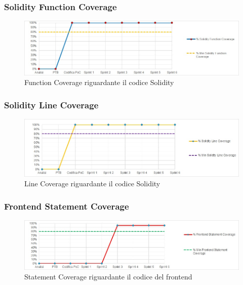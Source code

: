 \subsubsection{Solidity Function Coverage}
\begin{figure}[H]
  \centering
  \includegraphics[scale=0.8]{immagini/solidity_function.jpg}
  \caption{Function Coverage riguardante il codice Solidity}
\end{figure}

\subsubsection{Solidity Line Coverage}
\begin{figure}[H]
  \centering
  \includegraphics[scale=0.8]{immagini/solidity_line.jpg}
  \caption{Line Coverage riguardante il codice Solidity}
\end{figure}

\subsubsection{Frontend Statement Coverage}
\begin{figure}[H]
  \centering
  \includegraphics[scale=0.8]{immagini/frontend_statement.jpg}
  \caption{Statement Coverage riguardante il codice del frontend}
\end{figure}

